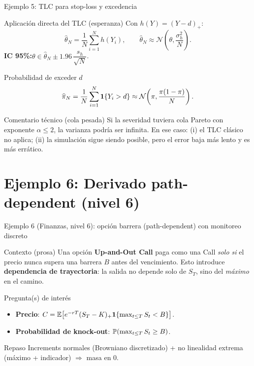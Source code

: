 \documentclass[aspectratio=1610, 9pt]{beamer}
\begin{document}
\begin{frame}{Ejemplo 5: TLC para stop-loss y excedencia}
\small
\begin{block}{Aplicación directa del TLC (esperanza)}
Con $h(Y)=(Y-d)_+$:
\[
\widehat{\theta}_N=\frac{1}{N}\sum_{i=1}^N h(Y_i),
\qquad
\widehat{\theta}_N \approx \mathcal{N}\!\left(\theta,\frac{\sigma_h^2}{N}\right).
\]
\textbf{IC 95\%:}\quad $\theta\in \widehat{\theta}_N \pm 1.96\,\dfrac{s_h}{\sqrt{N}}$.
\end{block}

\begin{block}{Probabilidad de exceder $d$}
\[
\widehat{\pi}_N=\frac{1}{N}\sum_{i=1}^N \mathbf{1}\{Y_i>d\}
\approx \mathcal{N}\!\left(\pi,\frac{\pi(1-\pi)}{N}\right).
\]
\end{block}

\begin{alertblock}{Comentario técnico (cola pesada)}
Si la severidad tuviera cola Pareto con exponente $\alpha\le 2$, la varianza podría ser infinita.
En ese caso: (i) el TLC clásico no aplica; (ii) la simulación sigue siendo posible, pero el error baja más lento y es más errático.
\end{alertblock}
\end{frame}

\section*{Ejemplo 6: Derivado path-dependent (nivel 6)}

\begin{frame}{Ejemplo 6 (Finanzas, nivel 6): opción barrera (path-dependent) con monitoreo discreto}
\small
\begin{block}{Contexto (prosa)}
Una opción \textbf{Up-and-Out Call} paga como una Call \emph{solo si} el precio nunca supera una barrera $B$ antes del vencimiento.
Esto introduce \textbf{dependencia de trayectoria}: la salida no depende solo de $S_T$, sino del \emph{máximo} en el camino.
\end{block}

\begin{block}{Pregunta(s) de interés}
\begin{itemize}
\item \textbf{Precio}: $C=\mathbb{E}\big[e^{-rT}(S_T-K)_+\mathbf{1}\{\max_{t\le T}S_t<B\}\big]$.
\item \textbf{Probabilidad de knock-out}: $\mathbb{P}(\max_{t\le T}S_t\ge B)$.
\end{itemize}
\end{block}

\begin{alertblock}{Repaso}
Increments normales (Browniano discretizado) + no linealidad extrema (máximo + indicador) $\Rightarrow$ masa en 0.
\end{alertblock}
\end{frame}
\end{document}
